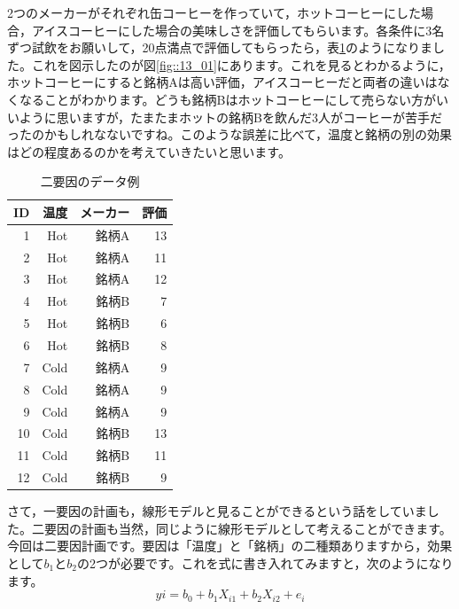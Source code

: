 \documentclass{ltjbook}
\begin{document}
2つのメーカーがそれぞれ缶コーヒーを作っていて，ホットコーヒーにした場合，アイスコーヒーにした場合の美味しさを評価してもらいます。各条件に3名ずつ試飲をお願いして，20点満点で評価してもらったら，表\ref{tbl::13_01}のようになりました。これを図示したのが図\ref{fig::13_01}にあります。これを見るとわかるように，ホットコーヒーにすると銘柄Aは高い評価，アイスコーヒーだと両者の違いはなくなることがわかります。どうも銘柄Bはホットコーヒーにして売らない方がいいように思いますが，たまたまホットの銘柄Bを飲んだ3人がコーヒーが苦手だったのかもしれなないですね。このような誤差に比べて，温度と銘柄の別の効果はどの程度あるのかを考えていきたいと思います。
\begin{table}[ht]
  \centering
  \caption{二要因のデータ例} 
  \begin{tabular}{rrrr}
    \hline
  ID  & 温度 & メーカー & 評価 \\ 
    \hline
  1  & Hot & 銘柄A & 13 \\ 
    2  & Hot & 銘柄A & 11 \\ 
    3  & Hot & 銘柄A & 12 \\ 
    4  & Hot & 銘柄B & 7 \\ 
    5  & Hot & 銘柄B & 6 \\ 
    6  & Hot & 銘柄B & 8 \\ 
    7  & Cold & 銘柄A & 9 \\ 
    8  & Cold & 銘柄A & 9 \\ 
    9  & Cold & 銘柄A & 9 \\ 
    10  & Cold & 銘柄B & 13 \\ 
    11  & Cold & 銘柄B & 11 \\ 
    12  & Cold & 銘柄B & 9 \\ 
     \hline
  \end{tabular}

  \label{tbl::13_01}
  \end{table}

さて，一要因の計画も，線形モデルと見ることができるという話をしていました。二要因の計画も当然，同じように線形モデルとして考えることができます。今回は二要因計画です。要因は「温度」と「銘柄」の二種類ありますから，効果として$b_1$と$b_2$の2つが必要です。これを式に書き入れてみますと，次のようになります。
\begin{equation}
    \label{eq13_03}
y{i} = b_0 + b_1 X_{i1}+ b_2 X_{i2} + e_{i}
\end{equation}
\end{document}
